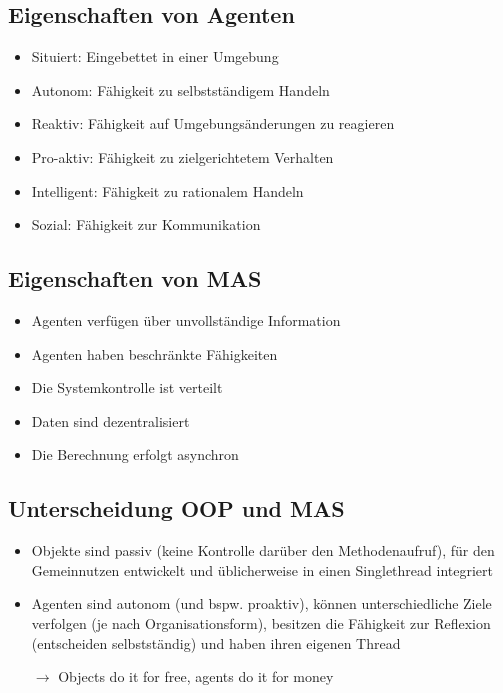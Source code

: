 \documentclass{article} %
\begin{document}
	\subsection{Eigenschaften von Agenten}
	\begin{itemize}
		\item Situiert: Eingebettet in einer Umgebung
		\item Autonom: Fähigkeit zu selbstständigem Handeln
		\item Reaktiv: Fähigkeit auf Umgebungsänderungen zu reagieren
		\item Pro-aktiv: Fähigkeit zu zielgerichtetem Verhalten
		\item Intelligent: Fähigkeit zu rationalem Handeln
		\item Sozial: Fähigkeit zur Kommunikation
	\end{itemize}
	\subsection{Eigenschaften von MAS}
	\begin{itemize}
		\item Agenten verfügen über unvollständige Information
		\item Agenten haben beschränkte Fähigkeiten
		\item Die Systemkontrolle ist verteilt
		\item Daten sind dezentralisiert
		\item Die Berechnung erfolgt asynchron
	\end{itemize}
	\subsection{Unterscheidung OOP und MAS}
	\begin{itemize}
		\item Objekte sind passiv (keine Kontrolle darüber den Methodenaufruf), für den Gemeinnutzen entwickelt und üblicherweise in einen Singlethread integriert
		\item Agenten sind autonom (und bspw. proaktiv), können unterschiedliche Ziele verfolgen (je nach Organisationsform), besitzen die Fähigkeit zur Reflexion (entscheiden selbstständig) und haben ihren eigenen Thread
		\item[$\rightarrow$] Objects do it for free, agents do it for money
	\end{itemize}
\end{document}
